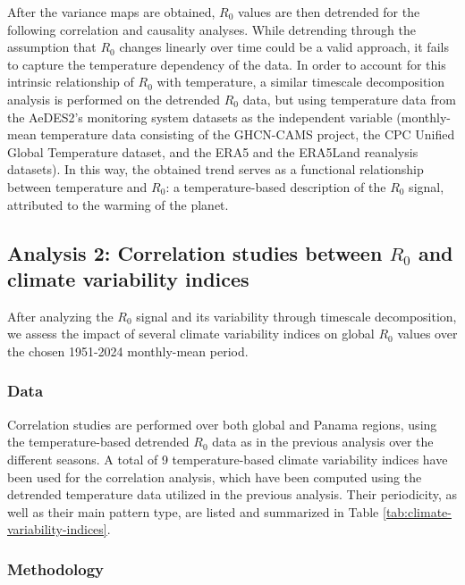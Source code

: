 \documentclass[10pt,twocolumn]{wlscirep}
\begin{document}
After the variance maps are obtained, $R_0$ values are then detrended for the following correlation and causality analyses. While detrending through the assumption that $R_0$ changes linearly over time could be a valid approach, it fails to capture the temperature dependency of the data. In order to account for this intrinsic relationship of $R_0$ with temperature, a similar timescale decomposition analysis is performed on the detrended $R_0$ data, but using temperature data from the AeDES2's monitoring system datasets as the independent variable (monthly-mean temperature data consisting of the GHCN-CAMS project\cite{fan_2008}, the CPC Unified Global Temperature dataset\cite{xie_2007}, and the ERA5 and the ERA5Land reanalysis datasets\cite{chen_2008}). In this way, the obtained trend serves as a functional relationship between temperature and $R_0$: a temperature-based description of the $R_0$ signal, attributed to the warming of the planet\cite{greene_2011}.

\subsection{Analysis 2: Correlation studies between $R_0$ and climate variability indices} \label{sec-methods-2}

After analyzing the $R_0$ signal and its variability through timescale decomposition, we assess the impact of several climate variability indices on global $R_0$ values over the chosen 1951-2024 monthly-mean period.

\subsubsection{Data} \label{sec-methods-2-data}

Correlation studies are performed over both global and Panama regions, using the temperature-based detrended $R_0$ data as in the previous analysis over the different seasons. A total of 9 temperature-based climate variability indices have been used for the correlation analysis, which have been computed using the detrended temperature data utilized in the previous analysis. Their periodicity, as well as their main pattern type, are listed and summarized in Table \ref{tab:climate-variability-indices}.


\subsubsection{Methodology} \label{sec-methods-2-methodology}
\end{document}

